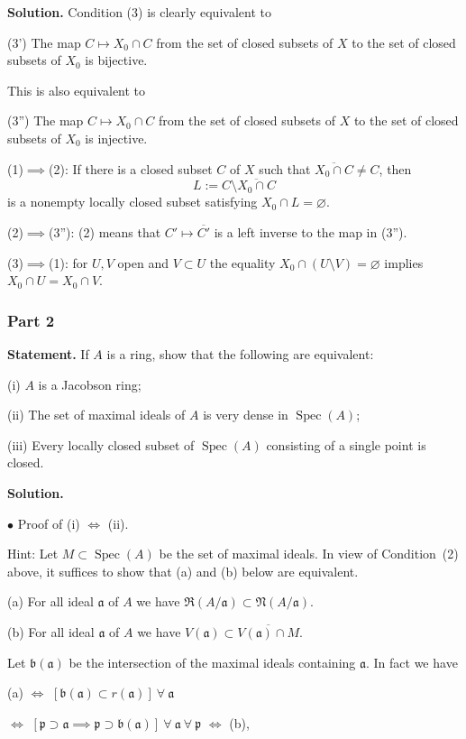 \documentclass[parskip=half,fontsize=12pt]{scrartcl}%
\newcommand{\mf}{\mathfrak}
\newcommand{\aaa}{\mf a}
\newcommand{\bbb}{\mf b}
\newcommand{\ppp}{\mf p}
\newcommand{\bu}{\bullet}
\newcommand{\Spec}{\operatorname{Spec}}\newcommand{\Sp}{\operatorname{Spec}}
\begin{document}
\textbf{Solution.} Condition (3) is clearly equivalent to 

(3') The map $C\mapsto X_0\cap C$ from the set of closed subsets of $X$ to the set of closed subsets of $X_0$ is bijective.

This is also equivalent to 

(3'') The map $C\mapsto X_0\cap C$ from the set of closed subsets of $X$ to the set of closed subsets of $X_0$ is injective.

(1)$\implies$(2): If there is a closed subset $C$ of $X$ such that $\overline{X_0\cap C}\ne C$, then 
$$
L:=C\setminus\overline{X_0\cap C}
$$ 
is  a nonempty locally closed subset satisfying $X_0\cap L=\varnothing$. 

(2)$\implies$(3''): (2) means that $C'\mapsto\overline{C'}$ is a left inverse to the map in (3''). 

(3)$\implies$(1): for $U,V$ open and $V\subset U$ the equality $X_0\cap(U\setminus V)=\varnothing$ implies $X_0\cap U=X_0\cap V$.%

\subsubsection{Part 2} 

\textbf{Statement.} If $A$ is a ring, show that the following are equivalent:

(i) $A$ is a Jacobson ring;

(ii) The set of maximal ideals of $A$ is very dense in $\Spec(A)$;

(iii) Every locally closed subset of $\Spec(A)$ consisting of a single point is closed.

\textbf{Solution.} 

$\bu$ Proof of (i) $\iff$ (ii). 

Hint: Let $M\subset\Spec(A)$ be the set of maximal ideals. In view of Condition~(2) above, it suffices to show that (a) and (b) below are equivalent.

(a) For all ideal $\aaa$ of $A$ we have $\mf R(A/\aaa)\subset\mf N(A/\aaa)$.

(b) For all ideal $\aaa$ of $A$ we have $V(\aaa)\subset\overline{V(\aaa)\cap M}$.

Let $\bbb(\aaa)$ be the intersection of the maximal ideals containing $\aaa$. In fact we have\medskip 

\centerline{(a) $\iff$ $[\bbb(\aaa)\subset r(\aaa)]\ \forall\ \aaa$}\bigskip

\centerline{$\iff$ $[\ppp\supset\aaa\implies\ppp\supset\bbb(\aaa)]\ \forall\ \aaa\ \forall\ \ppp$ $\iff$ (b),}\medskip 
\end{document}
